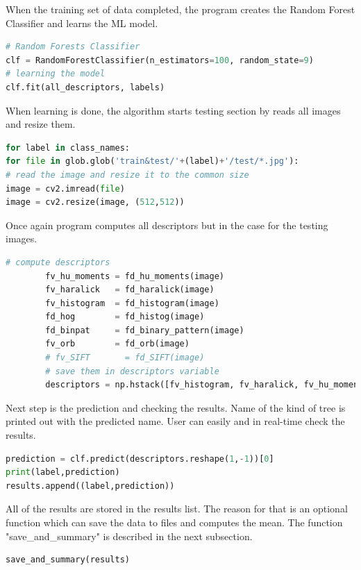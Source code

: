 \documentclass[12pt]{article}
\begin{document}
When the training set of data completed, the program creates the Random Forest Classifier and learns the ML model.

\begin{lstlisting}[language=Python]
# Random Forests Classifier
clf = RandomForestClassifier(n_estimators=100, random_state=9)
# learning the model
clf.fit(all_descriptors, labels)
\end{lstlisting}

When learning is done, the algorithm starts testing section by reads all images and resize them.

\begin{lstlisting}[language=Python]
for label in class_names:
for file in glob.glob('train&test/'+(label)+'/test/*.jpg'):
# read the image and resize it to the common size
image = cv2.imread(file)
image = cv2.resize(image, (512,512))
\end{lstlisting}

Once again program computes all descriptors but in the case for the testing images.

\begin{lstlisting}[language=Python]
        # compute descriptors
        fv_hu_moments = fd_hu_moments(image)
        fv_haralick   = fd_haralick(image)
        fv_histogram  = fd_histogram(image)
        fd_hog        = fd_histog(image)
        fd_binpat     = fd_binary_pattern(image)
        fv_orb        = fd_orb(image)
        # fv_SIFT       = fd_SIFT(image)
        # save them in descriptors variable
        descriptors = np.hstack([fv_histogram, fv_haralick, fv_hu_moments, fv_hog, fv_binpat, fv_orb])
\end{lstlisting}

Next step is the prediction and checking the results. Name of the kind of tree is printed out with the predicted name. User can easily and in real-time check the results.

\begin{lstlisting}[language=Python]
prediction = clf.predict(descriptors.reshape(1,-1))[0]
print(label,prediction)
results.append((label,prediction))
\end{lstlisting}

All of the results are stored in the results list. The reason for that is an optional function which can save the data to files and computes the mean.
The function "save\_and\_summary" is described in the next subsection.

\begin{lstlisting}[language=Python]
save_and_summary(results)
\end{lstlisting}
\end{document}
